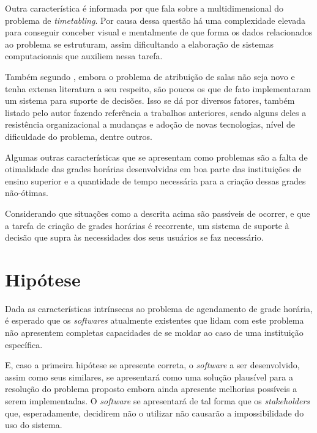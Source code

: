 Outra característica é informada por  que fala sobre a multidimensional do problema de \textit{timetabling}. Por causa dessa questão há uma complexidade elevada para conseguir conceber visual e mentalmente de que forma os dados relacionados ao problema se estruturam, assim dificultando a elaboração de sistemas computacionais que auxiliem nessa tarefa.

Também segundo , embora o problema de atribuição de salas não seja novo e tenha extensa literatura a seu respeito, são poucos os que de fato implementaram um sistema para suporte de decisões. Isso se dá por diversos fatores, também listado pelo autor fazendo referência a trabalhos anteriores, sendo alguns deles a resistência organizacional a mudanças e adoção de novas tecnologias, nível de dificuldade do problema, dentre outros.

Algumas outras características que se apresentam como problemas são a falta de otimalidade das grades horárias desenvolvidas em boa parte das instituições de ensino superior e a quantidade de tempo necessária para a criação dessas grades não-ótimas.

Considerando que situações como a descrita acima são passíveis de ocorrer, e que a tarefa de criação de grades horárias é recorrente, um sistema de suporte à decisão que supra às necessidades dos seus usuários se faz necessário.

\section{Hipótese} \label{sec:Hipótese}                  %

Dada as características intrínsecas ao problema de agendamento de grade horária, é esperado que os \textit{softwares} atualmente existentes que lidam com este problema não apresentem completas capacidades de se moldar ao caso de uma instituição específica.


E, caso a primeira hipótese se apresente correta, o \textit{software} a ser desenvolvido, assim como seus similares, se apresentará como uma solução plausível para a resolução do problema proposto embora ainda apresente melhorias possíveis a serem implementadas. O \textit{software} se apresentará de tal forma que os \textit{stakeholders} que, esperadamente, decidirem não o utilizar não causarão a impossibilidade do uso do sistema.

